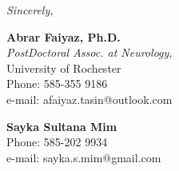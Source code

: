 \documentclass{letter}
\begin{document}
\begin{letter}









\vspace{1.5cm}
\textit{Sincerely,}

\begin{minipage}[t]{0.5\textwidth}
\vspace{1.5cm}
\textbf{Abrar Faiyaz, Ph.D.} \\
\textit{PostDoctoral Assoc. at Neurology,} \\
University of Rochester \\
Phone: 585-355 9186 \\
e-mail: afaiyaz.tasin@outlook.com \\
\end{minipage}%
\begin{minipage}[t]{0.5\textwidth}
\vspace{1.5cm}
\begin{flushright}
\textbf{Sayka Sultana Mim} \\
Phone: 585-202 9934 \\
e-mail: sayka.s.mim@gmail.com
\end{flushright}
\end{minipage}

\end{letter}
\end{document}
